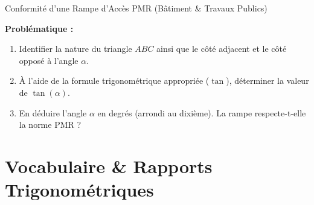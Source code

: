 \begin{activite}{Conformité d'une Rampe d'Accès PMR (Bâtiment \& Travaux Publics)}
\begin{minipage}[c]{0.48\linewidth}
\end{minipage}\hfill
\begin{minipage}[c]{0.48\linewidth}
\begin{tcolorbox}[colback=slate100, colframe=colPrimary, arc=5pt, boxrule=0.8pt, top=6pt, bottom=6pt, left=8pt, right=8pt]
\sffamily\small
\textbf{Problématique :}
\begin{enumerate}[leftmargin=1.2em, itemsep=4pt]
    \item Identifier la nature du triangle $ABC$ ainsi que le côté adjacent et le côté opposé à l'angle $\alpha$.
    \item À l'aide de la formule trigonométrique appropriée ($\tan$), déterminer la valeur de $\tan(\alpha)$.
    \item En déduire l'angle $\alpha$ en degrés (arrondi au dixième). La rampe respecte-t-elle la norme PMR ?
\end{enumerate}
\end{tcolorbox}
\end{minipage}

\vspace{3mm}
\lignesreponse[6]
\end{activite}

\newpage

\section{Vocabulaire \& Rapports Trigonométriques}

